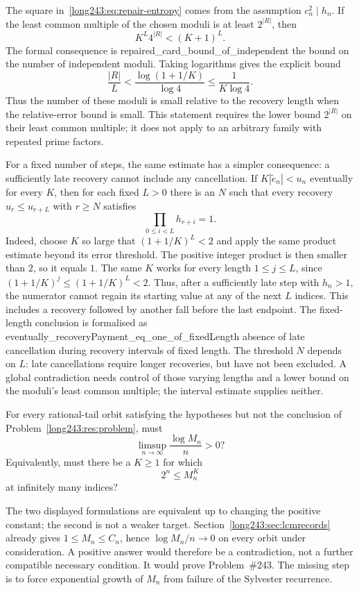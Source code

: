 \documentclass[11pt]{article}
\begin{document}
The square in~\eqref{long243:eq:repair-entropy} comes from the assumption
$c_n^2\mid h_n$. If the least common multiple of the chosen moduli
is at least $2^{|R|}$, then
\[
 K^L4^{|R|}<(K+1)^L.
\]
The formal consequence is
      {repaired_card_bound_of_independent}
      {the bound on the number of independent moduli}.
Taking logarithms gives the explicit bound
\[
 \frac{|R|}{L}<\frac{\log(1+1/K)}{\log4}
 \le\frac1{K\log4}.
\]
Thus the number of these moduli is small relative to the recovery length
when the relative-error bound is small. This statement requires the lower bound
$2^{|R|}$ on their least common multiple; it does not apply to an arbitrary
family with repeated prime factors.

For a fixed number of steps, the same estimate has a simpler consequence:
a sufficiently late recovery cannot include any cancellation.  If
$K|\tilde e_n|<u_n$ eventually for every $K$, then for each fixed $L>0$ there is an
$N$ such that every recovery $u_r\le u_{r+L}$ with $r\ge N$ satisfies
\[
 \prod_{0\le i<L}h_{r+i}=1.
\]
Indeed, choose $K$ so large that $(1+1/K)^L<2$ and apply the same
product estimate beyond its error threshold. The positive integer
product is then smaller than $2$, so it equals $1$.
The same $K$ works for every length $1\le j\le L$, since
$(1+1/K)^j\le(1+1/K)^L<2$. Thus, after a sufficiently late step with
$h_n>1$, the numerator cannot regain its starting value at any of the
next $L$ indices. This includes a recovery followed by another fall
before the last endpoint. The fixed-length conclusion is formalised as
      {eventually_recoveryPayment_eq_one_of_fixedLength}
      {absence of late cancellation during recovery intervals of fixed length}.
The threshold $N$ depends on $L$: late cancellations require longer
recoveries, but have not been excluded. A global contradiction needs
control of those varying lengths and a lower bound on the moduli's
least common multiple; the interval estimate supplies neither.

\begin{problem}\label{long243:res:lcmheight}
For every rational-tail orbit satisfying the hypotheses but not the conclusion of Problem~\ref{long243:res:problem},
must
\[
 \limsup_{n\to\infty}\frac{\log M_n}{n}>0?
\]
Equivalently, must there be a $K\ge1$ for which
\[
 2^n\le M_n^K
\]
at infinitely many indices?
\end{problem}

The two displayed formulations are equivalent up to changing the
positive constant; the second is not a weaker target.
Section~\ref{long243:sec:lcmrecords} already gives
$1\le M_n\le C_n$, hence $\log M_n/n\to0$ on every orbit under
consideration. A positive answer would therefore be a contradiction,
not a further compatible necessary condition. It would prove
Problem~\#243. The missing step is to force exponential growth of $M_n$
from failure of the Sylvester recurrence.
\end{document}

